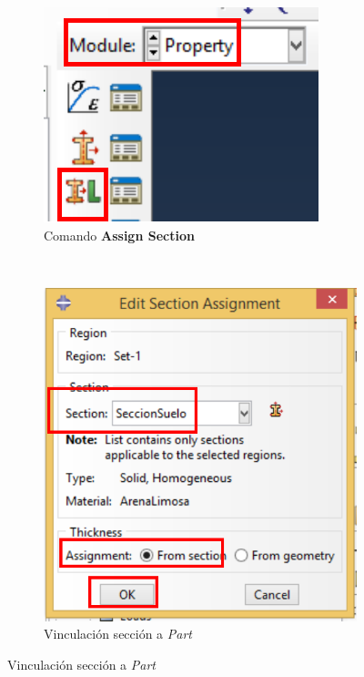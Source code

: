   \begin{figure}[!h]
    \centering
    \begin{subfigure}[!h]{0.20\textwidth}
      \includegraphics[width=\textwidth]{./body/images/prop05p.pdf}
      \caption{Comando \textbf{Assign Section}}
      \label{prop05p}
    \end{subfigure}%
    ~
    \begin{subfigure}[!h]{0.39\textwidth}
      \includegraphics[width=\textwidth]{./body/images/prop06.pdf}
      \caption{Vinculación sección a \textit{Part}}
      \label{prop06}
    \end{subfigure}%
    

\end{figure}
